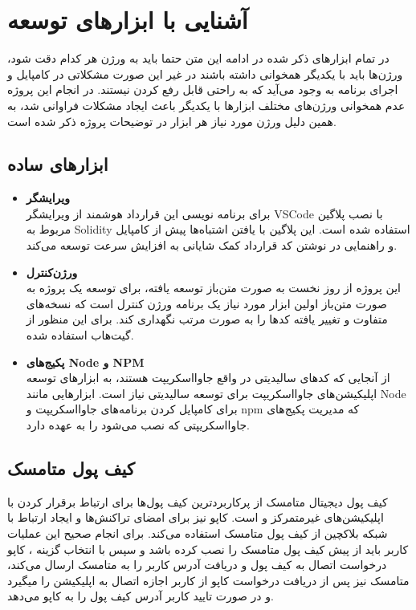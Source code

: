 \chapter{آشنایی با ابزار‌های توسعه}
در تمام ابزارهای ذکر شده در ادامه این متن حتما باید به ورژن هر کدام دقت شود، ورژن‌ها باید با یکدیگر همخوانی داشته باشند در غیر این صورت مشکلاتی در کامپایل و اجرای برنامه به وجود می‌آید که به راحتی قابل رفع کردن نیستند. در انجام این پروژه عدم همخوانی ورژن‌های مختلف ابزارها با یکدیگر باعث ایجاد مشکلات فراوانی شد، به همین دلیل ورژن مورد نیاز هر ابزار در توضیحات پروژه ذکر شده است.

\section{ابزارهای ساده}
\begin{itemize}
	\item \textbf{ویرایشگر}\\
	برای برنامه نویسی این قرارداد هوشمند از ویرایشگر VSCode با نصب
	پلاگین مربوط به Solidity
استفاده شده است. این پلاگین با یافتن اشتباه‌ها پیش از کامپایل و راهنمایی در نوشتن کد قرارداد کمک شایانی به افزایش سرعت توسعه می‌کند.

	\item \textbf{ورژن‌کنترل}\\
	این پروژه از روز نخست به صورت متن‌باز توسعه یافته، برای توسعه یک پروژه به صورت متن‌باز اولین ابزار مورد نیاز یک برنامه ورژن کنترل است که نسخه‌های متفاوت و تغییر یافته کدها را به صورت مرتب نگهداری کند. برای این منظور از گیت‌هاب استفاده شده.

	\item \textbf{پکیج‌های Node و NPM}\\
از آنجایی که کدهای سالیدیتی در واقع جاوا‌اسکریپت هستند، به ابزارهای توسعه اپلیکیشن‌های جاوااسکریپت برای توسعه سالیدیتی نیاز است. ابزارهایی مانند Node برای کامپایل کردن برنامه‌های جاوااسکریپت و npm که مدیریت پکیج‌های جاوااسکریپتی که نصب می‌شود را به عهده دارد.

\end{itemize}


\section{کیف پول متامسک}
کیف پول دیجیتال متامسک از پرکاربردترین کیف پول‌ها برای ارتباط برقرار کردن با اپلیکیشن‌های غیرمتمرکز و
است.
کاپو نیز برای امضای تراکنش‌ها و ایجاد ارتباط با شبکه بلاکچین از کیف پول متامسک استفاده می‌کند. برای انجام صحیح این عملیات کاربر باید از پیش کیف پول متامسک را نصب کرده باشد و سپس با انتخاب گزینه
،
کاپو درخواست اتصال به کیف پول و دریافت آدرس کاربر را به متامسک ارسال می‌کند، متامسک نیز پس از دریافت درخواست کاپو از کاربر اجازه اتصال به اپلیکیشن را میگیرد و در صورت تایید کاربر آدرس کیف پول را به کاپو می‌دهد.

